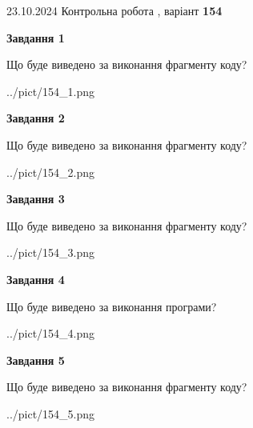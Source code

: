 \documentclass[12pt, ukrainian]{article}
\begin{document}
{\Large{23.10.2024 Контрольна робота , варіант  \No \textbf { 154 }\par}}
{
\begin {large}
{\begin {center}\textbf{Завдання 1}\end {center}}

Що буде виведено за виконання фрагменту коду?\par
\begin{center}
	{../pict/154_1.png}
\end{center}
\newpage

{\begin {center}\textbf{Завдання 2}\end {center}}

Що буде виведено за виконання фрагменту коду?\par
\begin{center}
	{../pict/154_2.png}
\end{center}
\newpage

{\begin {center}\textbf{Завдання 3}\end {center}}

Що буде виведено за виконання фрагменту коду?\par
\begin{center}
	{../pict/154_3.png}
\end{center}
\newpage

{\begin {center}\textbf{Завдання 4}\end {center}}

Що буде виведено за виконання програми?\par
\begin{center}
	{../pict/154_4.png}
\end{center}
\newpage

{\begin {center}\textbf{Завдання 5}\end {center}}

Що буде виведено за виконання фрагменту коду?\par
\begin{center}
	{../pict/154_5.png}
\end{center}
\newpage


\end{large}}
\end{document}
